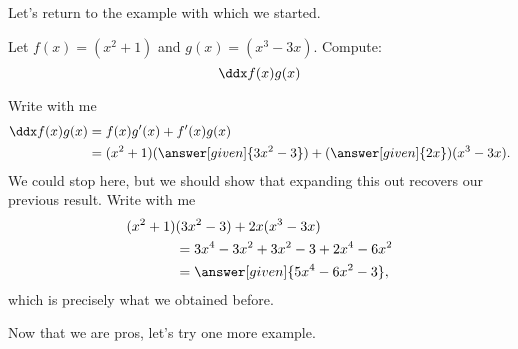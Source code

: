 \documentclass{ximera}
\begin{document}



Let's return to the example with which we started.
\begin{example} 
Let $f(x)=(x^2+1)$ and $g(x)=(x^3-3x)$. Compute:
\[
\ddx f(x)g(x)
\]

\begin{explanation}
Write with me
\begin{align*}
\ddx f(x)g(x) &= f(x)g'(x) + f'(x)g(x)\\
&=(x^2+1)(\answer[given]{3x^2-3}) + (\answer[given]{2x})(x^3-3x).
\end{align*}
We could stop here, but we should show that expanding this out recovers
our previous result. Write with me
\begin{align*}
(x^2+1)&(3x^2-3) + 2x(x^3-3x)\\
  &= 3x^4-3x^2 +3x^2 -3 + 2x^4-6x^2\\
&=\answer[given]{5x^4-6x^2-3},
\end{align*}
which is precisely what we obtained before.
\end{explanation}
\end{example}

Now that we are pros, let's try one more example.
\end{document}
